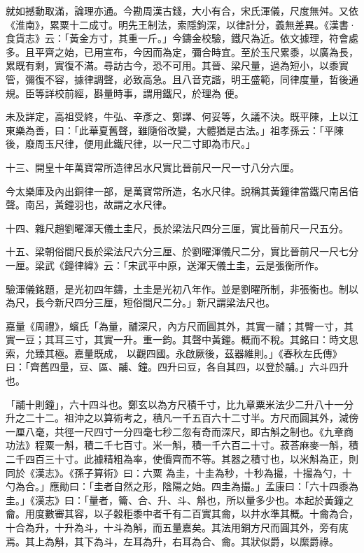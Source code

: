 \begin{pinyinscope}
 就如撼動取滿，論理亦通。今勘周漢古錢，大小有合，宋氏渾儀，尺度無舛。又依《淮南》，累粟十二成寸。明先王制法，索隱鉤深，以律計分，義無差異。《漢書·食貨志》云：「黃金方寸，其重一斤。」今鑄金校驗，鐵尺為近。依文據理，符會處多。且平齊之始，已用宣布，今因而為定，彌合時宜。至於玉尺累黍，以廣為長，累既有剩，實復不滿。尋訪古今，恐不可用。其晉、梁尺量，過為短小，以黍實管，彌復不容，據律調聲，必致高急。且八音克諧，明王盛範，同律度量，哲後通規。臣等詳校前經，斟量時事，謂用鐵尺，於理為
 便。



 未及詳定，高祖受終，牛弘、辛彥之、鄭譯、何妥等，久議不決。既平陳，上以江東樂為善，曰：「此華夏舊聲，雖隨俗改變，大體猶是古法。」祖孝孫云：「平陳後，廢周玉尺律，便用此鐵尺律，以一尺二寸即為市尺。」



 十三、開皇十年萬寶常所造律呂水尺實比晉前尺一尺一寸八分六厘。



 今太樂庫及內出銅律一部，是萬寶常所造，名水尺律。說稱其黃鐘律當鐵尺南呂倍聲。南呂，黃鐘羽也，故謂之水尺律。



 十四、雜尺趙劉曜渾天儀土圭尺，長於梁法尺四分三厘，實比晉前尺一尺五分。



 十五、梁朝俗間尺長於梁法尺六分三厘、於劉曜渾儀尺二分，實比晉前尺一尺七分一厘。梁武《鐘律緯》云：「宋武平中原，送渾天儀土圭，云是張衡所作。



 驗渾儀銘題，是光初四年鑄，土圭是光初八年作。並是劉曜所制，非張衡也。制以為尺，長今新尺四分三厘，短俗間尺二分。」新尺謂梁法尺也。



 嘉量《周禮》，蠙氏「為量，鬴深尺，內方尺而圓其外，其實一鬴；其臀一寸，其實一豆；其耳三寸，其實一升。重一鈞。其聲中黃鐘。概而不稅。其銘曰：時文思索，允臻其極。嘉量既成，
 以觀四國。永啟厥後，茲器維則。」《春秋左氏傳》曰：「齊舊四量，豆、區、鬴、鐘。四升曰豆，各自其四，以登於鬴。」六斗四升也。



 「鬴十則鐘」，六十四斗也。鄭玄以為方尺積千寸，比九章粟米法少二升八十一分升之二十二。祖沖之以算術考之，積凡一千五百六十二寸半。方尺而圓其外，減傍一厘八毫，共徑一尺四寸一分四毫七秒二忽有奇而深尺，即古斛之制也。《九章商功法》程粟一斛，積二千七百寸。米一斛，積一千六百二十寸。菽荅麻麥一斛，積二千四百三十寸。此據精粗為率，使價齊而不等。其器之積寸也，以米斛為正，則同於《漢志》。《孫子算術》曰：六粟
 為圭，十圭為秒，十秒為撮，十撮為勺，十勺為合。」應勛曰：「圭者自然之形，陰陽之始。四圭為撮。」孟康曰：「六十四黍為圭。」《漢志》曰：「量者，籥、合、升、斗、斛也，所以量多少也。本起於黃鐘之龠。用度數審其容，以子穀秬黍中者千有二百實其龠，以井水準其概。十龠為合，十合為升，十升為斗，十斗為斛，而五量嘉矣。其法用銅方尺而圓其外，旁有庣焉。其上為斛，其下為斗，左耳為升，右耳為合、龠。其狀似爵，以縻爵祿。




\end{pinyinscope}
